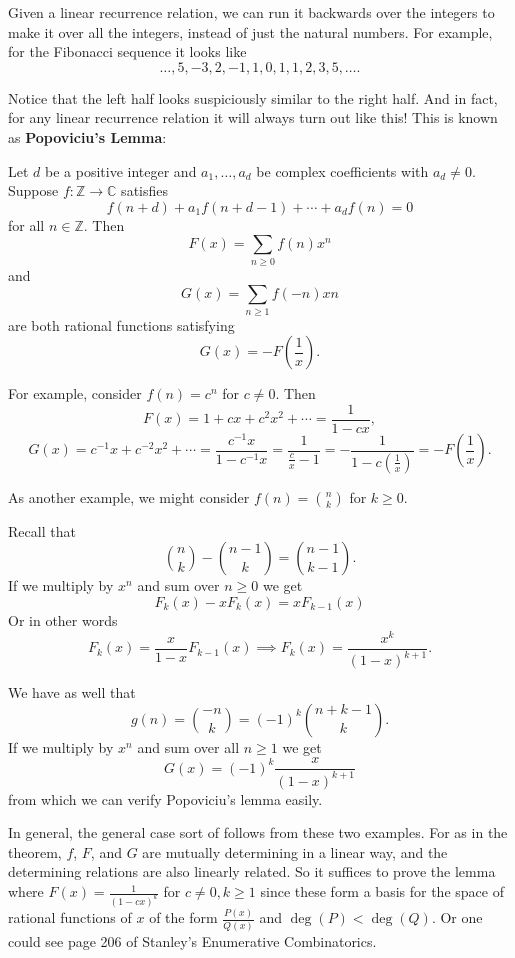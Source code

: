 Given a linear recurrence relation, we can run it backwards over the integers to make it over all the integers, instead of just the natural numbers. For example, for the Fibonacci sequence it looks like
\[\dots, 5, -3, 2, -1, 1, 0, 1, 1, 2, 3, 5, \dots.\]

Notice that the left half looks suspiciously similar to the right half. And in fact, for any linear recurrence relation it will always turn out like this! This is known as \textbf{Popoviciu's Lemma}:

\begin{theorem}
Let $d$ be a positive integer and $a_1, \dots, a_d$ be complex coefficients with $a_d \neq 0$. Suppose $f:\mathbb{Z} \to \mathbb{C}$ satisfies 
\[f(n + d) + a_1f(n + d - 1) + \cdots + a_df(n) = 0\]
for all $n \in \mathbb{Z}$. Then
\[F(x) = \sum_{n \geq 0}f(n)x^n\]
and 
\[G(x) = \sum_{n \geq 1}f(-n)xn\]
are both rational functions satisfying 
\[G(x) = -F\left(\frac{1}{x}\right).\]
\end{theorem}

For example, consider $f(n) = c^n$ for $c \neq 0$. Then 
\[F(x) = 1 + cx + c^2x^2 + \cdots = \frac{1}{1 - cx},\]
\[G(x) = c^{-1}x + c^{-2}x^2 + \cdots = \frac{c^{-1}x}{1 - c^{-1}x} = \frac{1}{\frac{c}{x} - 1} = -\frac{1}{1 - c\left(\frac{1}{x}\right)} = -F\left(\frac{1}{x}\right).\]

As another example, we might consider $f(n) = \binom{n}{k}$ for $k \geq 0$.

Recall that
\[\binom{n}{k} - \binom{n-1}{k} = \binom{n-1}{k-1}.\]
If we multiply by $x^n$ and sum over $n \geq 0$ we get 
\[F_k(x) - xF_k(x) = xF_{k-1}(x)\]
Or in other words
\[F_k(x) = \frac{x}{1-x}F_{k-1}(x) \implies F_k(x) = \frac{x^k}{(1-x)^{k + 1}}.\]

We have as well that 
\[g(n) = \binom{-n}{k} = (-1)^k\binom{n + k - 1}{k}.\] If we multiply by $x^n$ and sum over all $n \geq 1$ we get 
\[G(x) = (-1)^k\frac{x}{(1 - x)^{k + 1}}\] from which we can verify Popoviciu's lemma easily.

In general, the general case sort of follows from these two examples. For as in the theorem, $f$, $F$, and $G$ are mutually determining in a linear way, and the determining relations are also linearly related. So it suffices to prove the lemma where $F(x) = \frac{1}{(1 - cx)^k}$ for $c \neq 0, k \geq 1$ since these form a basis for the space of rational functions of $x$ of the form $\frac{P(x)}{Q(x)}$ and $\deg(P) < \deg(Q)$. Or one could see page 206 of Stanley's Enumerative Combinatorics.